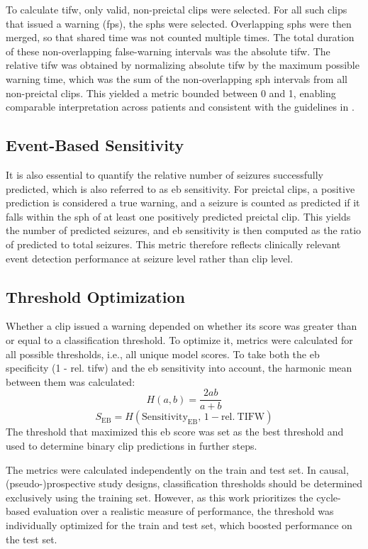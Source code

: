 To calculate \gls{tifw}, only valid, non-preictal clips were selected.
For all such clips that issued a warning (\glspl{fp}), the \glspl{sph} were selected.
Overlapping \glspl{sph} were then merged, so that shared time was not counted multiple times.
The total duration of these non-overlapping false-warning intervals was the absolute \gls{tifw}.
The relative \gls{tifw} was obtained by normalizing absolute \gls{tifw} by the maximum possible warning time, which was the sum of the non-overlapping \gls{sph} intervals from all non-preictal clips.
This yielded a metric bounded between 0 and 1, enabling comparable interpretation across patients and consistent with the guidelines in \textcite{mormann_seizure_2007}.

\subsection{Event-Based Sensitivity} \label{subsec:eb-sensitivity}
It is also essential to quantify the relative number of seizures successfully predicted, which is also referred to as \gls{eb} sensitivity.
For preictal clips, a positive prediction is considered a true warning, and a seizure is counted as predicted if it falls within the \gls{sph} of at least one positively predicted preictal clip.
This yields the number of predicted seizures, and \gls{eb} sensitivity is then computed as the ratio of predicted to total seizures.
This metric therefore reflects clinically relevant event detection performance at seizure level rather than clip level.

\subsection{Threshold Optimization} \label{subsec:threshold-optimization}
Whether a clip issued a warning depended on whether its score was greater than or equal to a classification threshold.
To optimize it, metrics were calculated for all possible thresholds, i.e., all unique model scores.
To take both the \gls{eb} specificity (1 - rel. \gls{tifw}) and the \gls{eb} sensitivity into account, the harmonic mean between them was calculated:
\begin{equation} \label{eq:harmonic-mean}
    H(a,b)=\frac{2ab}{a+b}
\end{equation}
\begin{equation} \label{eq:eb-score}
    S_{\mathrm{EB}} = H\!\left(\mathrm{Sensitivity}_{\mathrm{EB}},\, 1-\mathrm{rel.\ TIFW}\right)
\end{equation}
The threshold that maximized this \gls{eb} score was set as the best threshold and used to determine binary clip predictions in further steps.

The metrics were calculated independently on the train and test set.
In causal, (pseudo-)prospective study designs, classification thresholds should be determined exclusively using the training set. 
However, as this work prioritizes the cycle-based evaluation over a realistic measure of performance, the threshold was individually optimized for the train and test set, which boosted performance on the test set.
